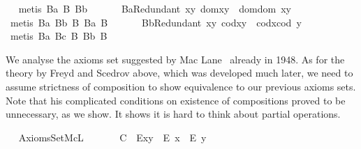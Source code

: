 \begin{isabellebody}
\isadelimproof
\ %
\endisadelimproof
%
\isatagproof
{}\isamarkupfalse%
\ {\isacharparenleft}metis\ B{}a\ B{}\ B{}b{\isacharparenright}%
\endisatagproof
{\isafoldproof}%
%
\isadelimproof
%
\endisadelimproof
\ \isanewline
\ \ \ \isamarkupfalse%
\ B{}aRedundant{\isacharcolon}\ {\isachardoublequoteopen}\isactrlbold {\isasymforall}x{\isachardot}\isactrlbold {\isasymforall}y{\isachardot}\ dom{\isacharparenleft}x{\isasymcdot}y{\isacharparenright}\ {\isasymcong}\ dom{\isacharparenleft}{\isacharparenleft}dom\ x{\isacharparenright}{\isasymcdot}y{\isacharparenright}{\isachardoublequoteclose}%
\isadelimproof
\ %
\endisadelimproof
%
\isatagproof
{}\isamarkupfalse%
\ {\isacharparenleft}metis\ B{}a\ B{}b\ B{}\ B{}a\ B{}{\isacharparenright}%
\endisatagproof
{\isafoldproof}%
%
\isadelimproof
%
\endisadelimproof
\ \isanewline
\ \ \ \isamarkupfalse%
\ B{}bRedundant{\isacharcolon}\ {\isachardoublequoteopen}\isactrlbold {\isasymforall}x{\isachardot}\isactrlbold {\isasymforall}y{\isachardot}\ cod{\isacharparenleft}x{\isasymcdot}y{\isacharparenright}\ {\isasymcong}\ cod{\isacharparenleft}x{\isasymcdot}{\isacharparenleft}cod\ y{\isacharparenright}{\isacharparenright}{\isachardoublequoteclose}%
\isadelimproof
\ %
\endisadelimproof
%
\isatagproof
{}\isamarkupfalse%
\ {\isacharparenleft}metis\ B{}a\ B{}c\ B{}\ B{}b\ B{}{\isacharparenright}%
\endisatagproof
{\isafoldproof}%
%
\isadelimproof
%
\endisadelimproof
\ \isanewline
\ \ \isamarkupfalse%
%
\isamarkuptrue%
%
\begin{isamarkuptext}%
We analyse the axioms set suggested by Mac Lane~\cite{MacLane48} already in 1948. 
      As for the theory by
       Freyd and Scedrov above, which was developed much later, we need to assume 
       strictness of composition to show equivalence to our previous axioms sets.
       Note that his complicated conditions on existence of compositions proved to be 
       unnecessary, as we show. It shows it is hard to think about partial operations.%
\end{isamarkuptext}\isamarkuptrue%
\ \isamarkupfalse%
\ AxiomsSetMcL\ {\isacharequal}\isanewline
\ \ \isanewline
\ \ \ C\ {\isacharcolon}\ {\isachardoublequoteopen}E{\isacharparenleft}x{\isasymcdot}y{\isacharparenright}\ \isactrlbold {\isasymrightarrow}\ {\isacharparenleft}E\ x\ \isactrlbold {\isasymand}\ E\ y{\isacharparenright}{\isachardoublequoteclose}\ \ \ \ \isanewline

\end{isabellebody}
